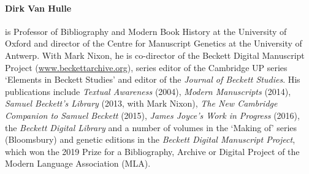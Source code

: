 \paragraph{Dirk Van Hulle} is Professor of Bibliography and Modern Book History at the University of Oxford and director of the Centre for Manuscript Genetics at the University of Antwerp. With Mark Nixon, he is co-director of the Beckett Digital Manuscript Project (\url{www.beckettarchive.org}), series editor of the Cambridge UP series ‘Elements in Beckett Studies’ and editor of the \textit{Journal of Beckett Studies}. His publications include \textit{Textual Awareness} (2004), \textit{Modern Manuscripts} (2014), \textit{Samuel Beckett’s Library} (2013, with Mark Nixon), \textit{The New Cambridge Companion to Samuel Beckett} (2015), \textit{James Joyce’s Work in Progress} (2016), the \textit{Beckett Digital Library} and a number of volumes in the ‘Making of’ series (Bloomsbury) and genetic editions in the \textit{Beckett Digital Manuscript Project}, which won the 2019 Prize for a Bibliography, Archive or Digital Project of the Modern Language Association (MLA).